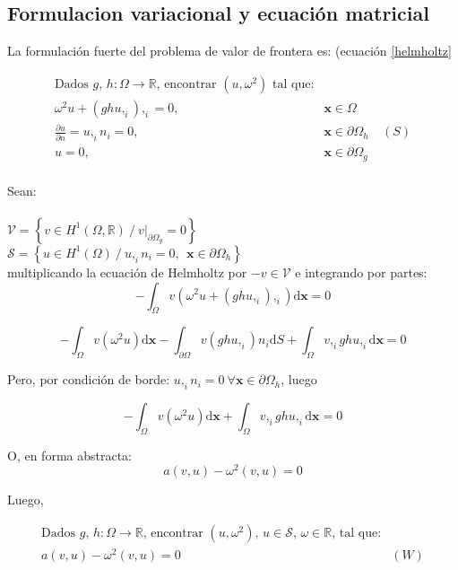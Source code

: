 \subsection{Formulacion variacional y ecuaci\'on matricial}
La formulación fuerte del problema de valor de frontera es: (ecuaci\'on \eqref{helmholtz}

\begin{align*}
\text{Dados $g$, $h: \Omega \rightarrow \mathbb{R}$, encontrar $(u, \omega^2)$ tal que:}\\
\omega^2 u + (gh u,_i),_i  = 0, \ \ \ \ & \boldsymbol{x} \in \Omega \\
\frac{\partial u}{\partial n} = u,_i n_i = 0, \ \ \ \ & \boldsymbol{x} \in \partial \Omega_h \ & (S) \\
u=0, \ \ \ \ &\boldsymbol{x} \in \partial \Omega_g\\
\end{align*}

Sean:\\ \\
$ \mathcal{V} = \left \{ v \in H^1 (\Omega, \mathbb{R}) \ /\  v|_{\partial \Omega_g} = 0 \right \}$\\
$ \mathcal{S} = \left \{ u \in H^1 (\Omega) \ /\  u,_i n_i = 0, \ \ \boldsymbol{x} \in \partial \Omega_h \right \}$\\ 

multiplicando la ecuaci\'on de Helmholtz por $-v \in \mathcal{V}$ e integrando por partes:\\

$$-\int_{\Omega} v \left( \omega^2 u + (gh u,_i),_i \right) \mathrm{d}\boldsymbol{x} = 0$$

$$-\int_{\Omega} v ( \omega^2 u )\mathrm{d}\boldsymbol{x} -\int_{\partial \Omega} v (gh u,_i) n_i \mathrm{d} S
+\int_{\Omega} v,_i g h u,_i \mathrm{d}\boldsymbol{x} = 0$$

Pero, por condici\'on de borde: $u,_i n_i = 0 \ \forall \boldsymbol{x} \in \partial \Omega_h$, luego

$$-\int_{\Omega} v ( \omega^2 u )\mathrm{d}\boldsymbol{x} 
+\int_{\Omega} v,_i g h u,_i \mathrm{d}\boldsymbol{x} = 0$$

O, en forma abstracta:
\begin{equation}
a(v, u) - \omega^2 (v, u) = 0
\label{eq:debil_abstracta}
\end{equation}

Luego, 

\begin{align*}
\text{Dados $g$, $h: \Omega \rightarrow \mathbb{R}$, encontrar $(u, \omega^2)$, $u \in \mathcal{S} $, $\omega \in \mathbb{R}$, tal que:}\\
a(v, u) - \omega^2 (v, u) = 0 \ \ \ \ \  & (W) \\
\end{align*}

